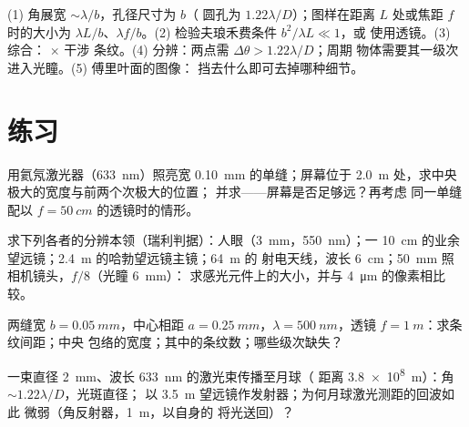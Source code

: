\begin{method}[衍射的数量估算]\label{met:b2:diffraction:method}
(1) 角展宽 $\sim\lambda/b$，孔径尺寸为 $b$（
圆孔为 $1.22\lambda/D$）；图样在距离 $L$ 处或焦距 $f$ 时的大小为
$\lambda L/b$、$\lambda f/b$。(2) 检验夫琅禾费条件 $b^2/\lambda L \ll 1$，或
使用透镜。(3) 综合： $\times$ 干涉
条纹。(4) 分辨：两点需 $\Delta\theta > 1.22\lambda/D$；周期
物体需要其一级次进入光瞳。(5) 傅里叶面的图像：
挡去什么即可去掉哪种细节。
\end{method}

\section{练习}

\begin{exercise}[$\star$]\label{exo:b2:diffraction:1}
用氦氖激光器（\qty{633}{nm}）照亮宽 \qty{0.10}{mm} 的单缝；屏幕位于
\qty{2.0}{m} 处，求中央极大的宽度与前两个次极大的位置；
并求——屏幕是否足够远？再考虑
同一单缝配以 $f = \qty{50}{cm}$ 的透镜时的情形。
\end{exercise}

\begin{exercise}[$\star$]\label{exo:b2:diffraction:2}
求下列各者的分辨本领（瑞利判据）：人眼（\qty{3}{mm}，\qty{550}{nm}）；一
\qty{10}{cm} 的业余望远镜；\qty{2.4}{m} 的哈勃望远镜主镜；\qty{64}{m} 的
射电天线，波长 \qty{6}{cm}；\qty{50}{mm} 照相机镜头，$f/8$（光瞳 \qty{6}{mm}）：
求感光元件上的大小，并与 \qty{4}{\micro m} 的像素相比较。
\end{exercise}

\begin{exercise}[$\star$]\label{exo:b2:diffraction:3}
两缝宽 $b = \qty{0.05}{mm}$，中心相距 $a = \qty{0.25}{mm}$，$\lambda =
\qty{500}{nm}$，透镜 $f = \qty{1}{m}$：求条纹间距；中央
包络的宽度；其中的条纹数；哪些级次缺失？
\end{exercise}

\begin{exercise}[$\star$]\label{exo:b2:diffraction:4}
一束直径 \qty{2}{mm}、波长 \qty{633}{nm} 的激光束传播至月球（
距离 \qty{3.8e8}{m}）：角 $\sim1.22\lambda/D$，光斑直径；
以 \qty{3.5}{m} 望远镜作发射器；为何月球激光测距的回波如此
微弱（角反射器，\qty{1}{m}，以自身的
将光送回）？
\end{exercise}

